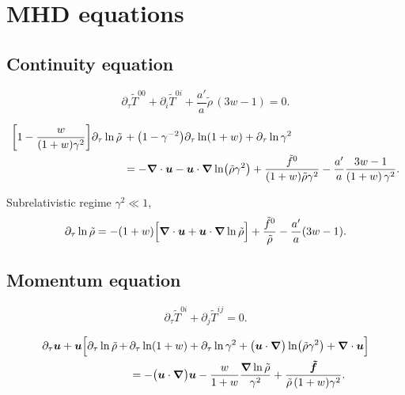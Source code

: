 \documentclass[prd, aps]{article}
\begin{document}
\maketitle

\section{MHD equations}

\subsection{Continuity equation}
\begin{equation}
    \boxed{
    \partial_\tau \tilde T^{00} + \partial_i \tilde T^{0i} + \frac{a'}{a}
    \tilde \rho \, (3w - 1) = 0.}
\end{equation}

\begin{align}
    \biggl[1 - \frac{w}{(1 + w) \gamma^2}
    \biggr]
    \partial_\tau \ln \tilde \rho &\, +  \bigl(1 - \gamma^{-2} \bigr) \partial_\tau \ln (1 + w) + \partial_\tau \ln \gamma^2 \nonumber \\
    &\, = - \nab \cdot \uu
    - \uu \cdot \nab \ln \bigl(\tilde \rho \gamma^2 \bigr) + \frac{\tilde f^0}{(1 + w) \tilde \rho \gamma^2} - \frac{a'}{a}
    \frac{3w - 1}
    {(1 + w) \, \gamma^2}.
\end{align}

Subrelativistic regime $\gamma^2 \ll 1$,
\begin{align}
    \partial_\tau \ln \tilde \rho = - (1 + w) \Bigl[ \nab \cdot \uu
    + \uu \cdot \nab \ln \tilde \rho \Bigr]  + \frac{\tilde f^0}{\tilde \rho} - \frac{a'}{a}
    (3w - 1).
    \label{cont_sub}
\end{align}

\subsection{Momentum equation}

\begin{equation}
    \boxed{\partial_\tau \tilde T^{0i} 
    + \partial_j \tilde T^{ij} = 0.}
\end{equation}

\begin{align}
    \partial_\tau \uu + \uu \Bigl[ \partial_\tau \ln \tilde \rho \,
    + &\, \partial_\tau \ln (1 + w) + \partial_\tau \ln \gamma^2 + 
    \bigl(\uu \cdot \nab\bigr)
    \ln \bigl( \tilde \rho \gamma^2\bigr) + \nab \cdot \uu \Bigr] \nonumber \\
    &\, = - \bigl(\uu \cdot \nab \bigr) \uu - \frac{w}{1 + w} \frac{\nab \ln \tilde \rho}{\gamma^2} + \frac{\tff}{\tilde \rho\, (1 + w) \gamma^2}.
    \label{mom_1}
\end{align}
\end{document}
